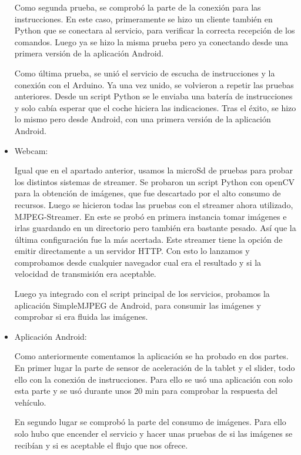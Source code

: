 \documentclass{pclass}
\begin{document}
\begin{itemize}
		Como segunda prueba, se comprobó la parte de la conexión para las instrucciones. En este caso, primeramente se hizo un cliente también en Python que se conectara al servicio, para verificar la correcta recepción de los comandos. Luego ya se hizo la misma prueba pero ya conectando desde una primera versión de la aplicación Android.
		
		Como última prueba, se unió el servicio de escucha de instrucciones y la conexión con el Arduino. Ya una vez unido, se volvieron a repetir las pruebas anteriores. Desde un script Python se le enviaba una batería de instrucciones y solo cabía esperar que el coche hiciera las indicaciones. Tras el éxito, se hizo lo mismo pero desde Android, con una primera versión de la aplicación Android.
		
	
	
	\item Webcam:
	
		Igual que en el apartado anterior, usamos la microSd de pruebas para probar los distintos sistemas de streamer. Se probaron un script Python con openCV para la obtención de imágenes, que fue descartado por el alto consumo de recursos. Luego se hicieron todas las pruebas con el streamer ahora utilizado, MJPEG-Streamer. En este se probó en primera instancia tomar imágenes e irlas guardando en un directorio pero también era bastante pesado. Así que la última configuración fue la más acertada. Este streamer tiene la opción de emitir directamente a un servidor HTTP. Con esto lo lanzamos y comprobamos desde cualquier navegador cual era el resultado y si la velocidad de transmisión era aceptable.
		
		Luego ya integrado con el script principal de los servicios, probamos la aplicación SimpleMJPEG de Android, para consumir las imágenes y comprobar si era fluida las imágenes.
	
	\item Aplicación Android:
	
		Como anteriormente comentamos la aplicación se ha probado en dos partes. En primer lugar la parte de sensor de aceleración de la tablet y el slider, todo ello con la conexión de instrucciones. Para ello se usó una aplicación con solo esta parte y se usó durante unos 20 min para comprobar la respuesta del vehículo.
		
		En segundo lugar se comprobó la parte del consumo de imágenes. Para ello solo hubo que encender el servicio y hacer unas pruebas de si las imágenes se recibían y si es aceptable el flujo que nos ofrece.
		

\end{itemize}
\end{document}
